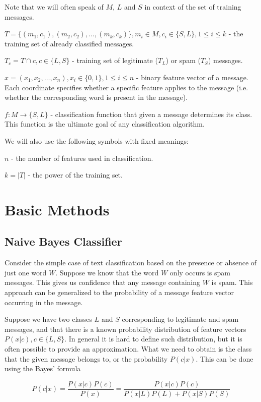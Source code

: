 \documentclass[12pt]{report}
\begin{document}
Note that we will often speak of $M$, $L$ and $S$ in context of the set of training messages.

$T = \{(m_1, c_1), (m_2, c_2), ..., (m_k, c_k)\}, m_i \in M, c_i \in \{S, L\}, 1 \leq i \leq k$ - the training set of already classified messages.

$T_c = T \cap c, c \in \{L, S\}$ - training set of legitimate ($T_L$) or spam ($T_S$) messages.

$x = (x_1, x_2, \dots, x_n), x_i \in \{0, 1\}, 1 \leq i \leq n$ - binary feature vector of a message. Each coordinate specifies whether a specific feature applies to the message (i.e. whether the corresponding word is present in the message).

$f : M \rightarrow \{S, L\}$ - classification function that given a message determines its class. This function is the ultimate goal of any classification algorithm.

We will also use the following symbols with fixed meanings:

$n$ - the number of features used in classification.

$k = |T|$ - the power of the training set.

\newpage


\chapter{Basic Methods}

\section{Naive Bayes Classifier}

Consider the simple case of text classification based on the presence or absence of just one word $W$. Suppose we know that the word $W$ only occurs is spam messages. This gives us confidence that any message containing $W$ is spam. This approach can be generalized to the probability of a message feature vector occurring in the message.

Suppose we have two classes $L$ and $S$ corresponding to legitimate and spam messages, and that there is a known probability distribution of feature vectors $P(x | c), c \in \{L, S\}$. In general it is hard to define such distribution, but it is often possible to provide an approximation. What we need to obtain is the class that the given message belongs to, or the probability $P(c | x)$. This can be done using the Bayes' formula

$$P(c | x) = \dfrac{P(x | c) P(c)}{P(x)} = \dfrac{P(x | c) P(c)}{P(x | L) P(L) + P(x | S) P(S)}$$
\end{document}
